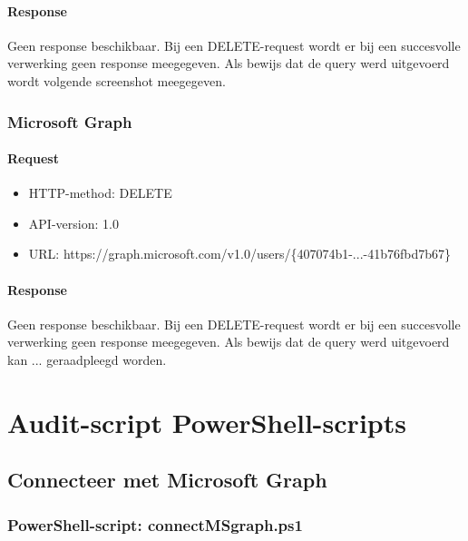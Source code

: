 \subsubsection{Response}

Geen response beschikbaar. Bij een DELETE-request wordt er bij een succesvolle verwerking geen response meegegeven. Als bewijs dat de query werd uitgevoerd wordt volgende screenshot meegegeven. 


\subsection{Microsoft Graph}

\subsubsection{Request}

\begin{itemize}
    \item \Ac{HTTP}-method: DELETE
    \item \ac{API}-version: 1.0
    \item \Ac{URL}: https://graph.microsoft.com/v1.0/users/\{407074b1-...-41b76fbd7b67\}
\end{itemize}

\subsubsection{Response}

Geen response beschikbaar. Bij een DELETE-request wordt er bij een succesvolle verwerking geen response meegegeven. Als bewijs dat de query werd uitgevoerd kan ... geraadpleegd worden. %


\chapter{Audit-script PowerShell-scripts}%
\label{ch:PowerShell-scripts}

\clearpage

\section{Connecteer met Microsoft Graph}

\subsection{PowerShell-script: connectMSgraph.ps1}


